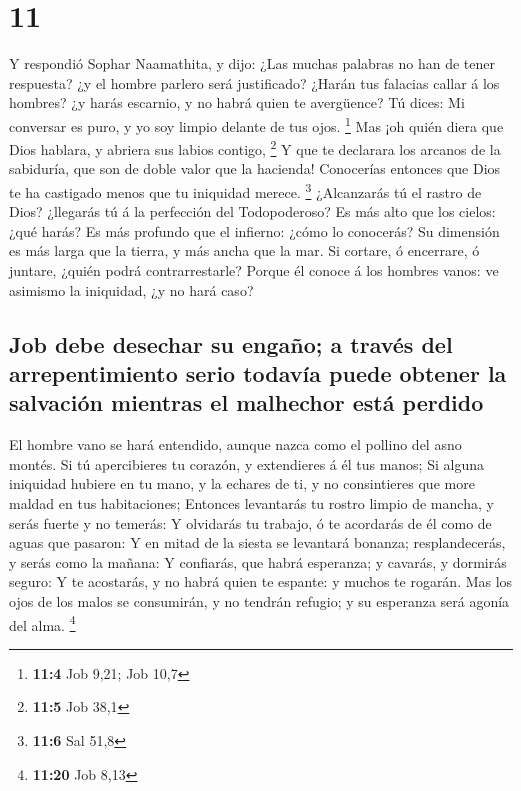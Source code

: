\hypertarget{section-10}{%
\section{11}\label{section-10}}

 Y respondió Sophar Naamathita, y dijo:  ¿Las
muchas palabras no han de tener respuesta? ¿y el hombre parlero será
justificado?  ¿Harán tus falacias callar á los hombres? ¿y
harás escarnio, y no habrá quien te avergüence?  Tú dices:
Mi conversar es puro, y yo soy limpio delante de tus ojos. \footnote{\textbf{11:4}
  Job 9,21; Job 10,7}  Mas ¡oh quién diera que Dios hablara,
y abriera sus labios contigo, \footnote{\textbf{11:5} Job 38,1}
 Y que te declarara los arcanos de la sabiduría, que son de
doble valor que la hacienda! Conocerías entonces que Dios te ha
castigado menos que tu iniquidad merece. \footnote{\textbf{11:6} Sal
  51,8}  ¿Alcanzarás tú el rastro de Dios? ¿llegarás tú á la
perfección del Todopoderoso?  Es más alto que los cielos:
¿qué harás? Es más profundo que el infierno: ¿cómo lo conocerás?
 Su dimensión es más larga que la tierra, y más ancha que la
mar.  Si cortare, ó encerrare, ó juntare, ¿quién podrá
contrarrestarle?  Porque él conoce á los hombres vanos: ve
asimismo la iniquidad, ¿y no hará caso?

\hypertarget{job-debe-desechar-su-engauxf1o-a-travuxe9s-del-arrepentimiento-serio-todavuxeda-puede-obtener-la-salvaciuxf3n-mientras-el-malhechor-estuxe1-perdido}{%
\subsection{Job debe desechar su engaño; a través del arrepentimiento
serio todavía puede obtener la salvación mientras el malhechor está
perdido}\label{job-debe-desechar-su-engauxf1o-a-travuxe9s-del-arrepentimiento-serio-todavuxeda-puede-obtener-la-salvaciuxf3n-mientras-el-malhechor-estuxe1-perdido}}

 El hombre vano se hará entendido, aunque nazca como el
pollino del asno montés.  Si tú apercibieres tu corazón, y
extendieres á él tus manos;  Si alguna iniquidad hubiere en
tu mano, y la echares de ti, y no consintieres que more maldad en tus
habitaciones;  Entonces levantarás tu rostro limpio de
mancha, y serás fuerte y no temerás:  Y olvidarás tu
trabajo, ó te acordarás de él como de aguas que pasaron:  Y
en mitad de la siesta se levantará bonanza; resplandecerás, y serás como
la mañana:  Y confiarás, que habrá esperanza; y cavarás, y
dormirás seguro:  Y te acostarás, y no habrá quien te
espante: y muchos te rogarán.  Mas los ojos de los malos se
consumirán, y no tendrán refugio; y su esperanza será agonía del alma.
\footnote{\textbf{11:20} Job 8,13}

